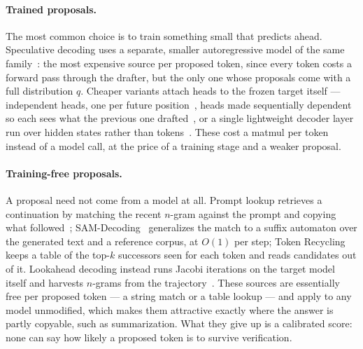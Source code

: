 \documentclass{article} %
\makeatletter
\newenvironment{ai}
  {\color{lightgray}%
   \@ifpackageloaded{caption}{\captionsetup{font={color=lightgray}}}{}%
   \let\ai@savedfloatreset\@floatboxreset
   \g@addto@macro\@floatboxreset{\color{lightgray}}}
  {\global\let\@floatboxreset\ai@savedfloatreset}
\makeatother
\begin{document}
\begin{ai}

\paragraph{Trained proposals.}
The most common choice is to train something small that predicts ahead.
Speculative decoding uses a separate, smaller autoregressive model of the same
family~\citep{leviathan2023speculative,chen2023accelerating}: the most expensive
source per proposed token, since every token costs a forward pass through the
drafter, but the only one whose proposals come with a full distribution $q$.
Cheaper variants attach heads to the frozen target itself --- independent heads,
one per future position~\citep{stern2018blockwise,cai2024medusa}, heads made
sequentially dependent so each sees what the previous one
drafted~\citep{ankner2024hydra}, or a single lightweight decoder layer run over
hidden states rather than tokens~\citep{li2024eagle,li2024eagle2}. These cost a
matmul per token instead of a model call, at the price of a training stage and a
weaker proposal.

\paragraph{Training-free proposals.}
A proposal need not come from a model at all. Prompt lookup retrieves a
continuation by matching the recent $n$-gram against the prompt and copying what
followed~\citep{saxena2023pld}; SAM-Decoding~\citep{hu2024samdecoding} generalizes the
match to a suffix automaton over the generated text and a reference corpus, at
$O(1)$ per step; Token Recycling~\citep{luo2025recycling} keeps a table of the
top-$k$ successors seen for each token and reads candidates out of it. Lookahead decoding instead runs Jacobi iterations on
the target model itself and harvests $n$-grams from the
trajectory~\citep{fu2024lookahead}. These sources are essentially free per
proposed token --- a string match or a table lookup --- and apply to any model
unmodified, which makes them attractive exactly where the answer is partly
copyable, such as summarization. What they give up is a calibrated score: none
can say how likely a proposed token is to survive verification.


\end{ai}
\end{document}
